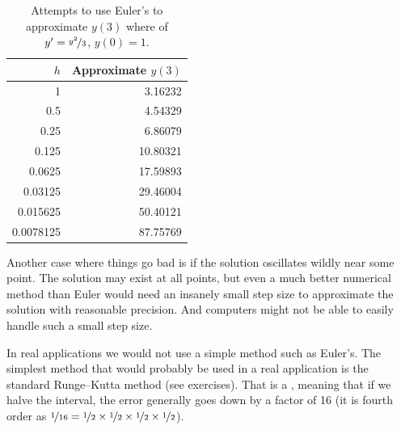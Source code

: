\begin{table}[h!t]
\mybeginframe
\capstart
\begin{center}
\begin{tabular}{@{}rr@{}}
\toprule
$h$ & Approximate $y(3)$ \\
\midrule
1        & 3.16232 \\
0.5      & 4.54329 \\
0.25     & 6.86079 \\
0.125    & 10.80321 \\
0.0625   & 17.59893 \\
0.03125  & 29.46004 \\
0.015625 & 50.40121 \\
0.0078125& 87.75769 \\
\bottomrule
\end{tabular}
\end{center}
\caption{Attempts to use Euler's to approximate $y(3)$ where
of $y'=\nicefrac{y^2}{3}$, $y(0)=1$.\label{euler-table2:table}}
\myendframe
\end{table}

Another case where things go bad is if the solution oscillates wildly
near some point.
The solution
may exist at all points, but even a much better numerical method than
Euler would need an insanely small step size to approximate the solution
with reasonable precision.
And computers might not be able to easily handle such a small step size.

\medskip

In real applications we would not use a simple method such as Euler's.  The
simplest method that would probably be used in a real application is the
standard Runge--Kutta method (see exercises).  That is a
,
meaning that if we halve the interval, the error generally
goes down by a factor of 16 (it is fourth order as $\nicefrac{1}{16} =
\nicefrac{1}{2} \times \nicefrac{1}{2}
\times \nicefrac{1}{2} \times \nicefrac{1}{2}$).


